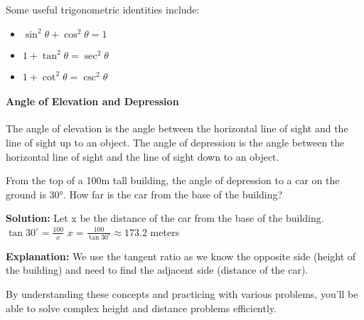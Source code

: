 Some useful trigonometric identities include:

\begin{itemize}
    \item $\sin^2 \theta + \cos^2 \theta = 1$
    \item $1 + \tan^2 \theta = \sec^2 \theta$
    \item $1 + \cot^2 \theta = \csc^2 \theta$
\end{itemize}

\paragraph{Angle of Elevation and Depression}

The angle of elevation is the angle between the horizontal line of sight
and the line of sight up to an object. The angle of depression is the
angle between the horizontal line of sight and the line of sight down to
an object.

\begin{example}
From the top of a 100m tall building, the angle of depression to a car on the ground is 30°. How far is the car from the base of the building?

\textbf{Solution:}
Let x be the distance of the car from the base of the building.
$\tan 30^\circ = \frac{100}{x}$
$x = \frac{100}{\tan 30^\circ} \approx 173.2$ meters

\textbf{Explanation:} We use the tangent ratio as we know the opposite side (height of the building) and need to find the adjacent side (distance of the car).
\end{example}

By understanding these concepts and practicing with various problems,
you'll be able to solve complex height and distance problems
efficiently.


